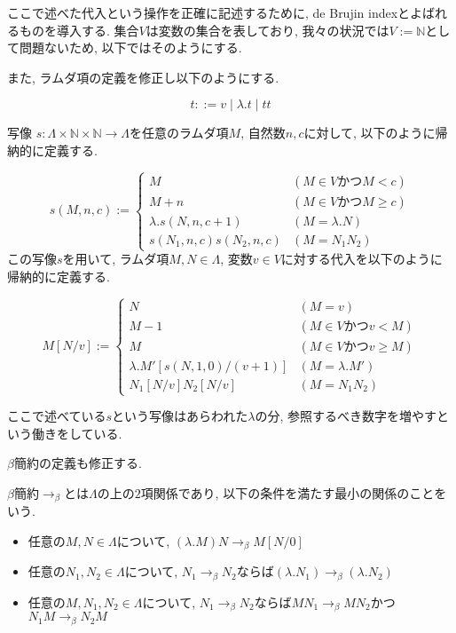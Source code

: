 \documentclass[12pt, titlepage]{ltjsarticle}
\begin{document}
ここで述べた代入という操作を正確に記述するために, de Brujin indexとよばれるものを導入する.
集合$V$は変数の集合を表しており, 我々の状況では$V := \mathbb{N}$として問題ないため, 以下ではそのようにする.

また, ラムダ項の定義を修正し以下のようにする.

\begin{defn}
 \[
 t ::= v \mid \lambda. t \mid t t
 \]
\end{defn}

\begin{defn}
 写像 $s \colon \Lambda \times \mathbb{N} \times \mathbb{N} \rightarrow \Lambda$を任意のラムダ項$M$, 自然数$n, c$に対して, 以下のように帰納的に定義する.

\[
  s (M, n, c) := \begin{cases}
    M & (M \in V \text{かつ} M < c) \\
    M + n & (M \in V \text{かつ} M \geq c) \\
    \lambda. s (N, n, c + 1) & (M = \lambda. N) \\
    s (N_1, n, c) s (N_2, n, c) & (M = N_1 N_2)
  \end{cases}
\]
 この写像$s$を用いて, ラムダ項$M, N \in \Lambda$, 変数$v \in V$に対する代入を以下のように帰納的に定義する.

\[
 M[N/v] := \begin{cases}
    N & (M = v) \\
    M - 1 & (M \in V \text{かつ} v < M) \\
    M & (M \in V \text{かつ} v \geq M) \\
    \lambda. M' [s (N, 1, 0)/(v + 1)] & (M = \lambda. M') \\
    N_1[N/v] N_2[N/v] & (M = N_1 N_2)
  \end{cases}
\]
\end{defn}

ここで述べている$s$という写像はあらわれた$\lambda$の分, 参照するべき数字を増やすという働きをしている.

$\beta$簡約の定義も修正する.

\begin{defn}
 $\beta$簡約$\rightarrow_{\beta}$とは$\Lambda$の上の$2$項関係であり, 以下の条件を満たす最小の関係のことをいう.
 \begin{itemize}
  \item 任意の$M, N \in \Lambda$について, $(\lambda. M) N \rightarrow_\beta M[N/0]$
  \item 任意の$N_1, N_2 \in \Lambda$について, $N_1 \rightarrow_\beta N_2$ならば$(\lambda. N_1) \rightarrow_\beta (\lambda. N_2)$
  \item 任意の$M, N_1, N_2 \in \Lambda$について, $N_1 \rightarrow_\beta N_2$ならば$M N_1 \rightarrow_\beta M N_2$かつ$N_1 M \rightarrow_\beta N_2 M$
 \end{itemize}
\end{defn}
\end{document}
